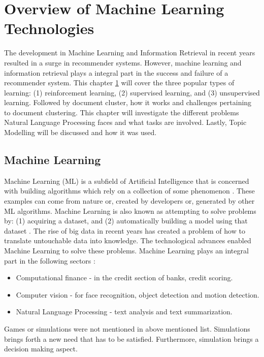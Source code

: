 \chapter{Overview of Machine Learning Technologies}
\label{chap: Chapter 3}
The development in Machine Learning and Information Retrieval in recent years resulted in a surge in recommender systems. However, machine learning and information retrieval plays a integral part in the success and failure of a recommender system. This chapter \ref{chap: Chapter 3} will cover the three popular types of learning: (1) reinforcement learning, (2) supervised learning, and (3) unsupervised learning. Followed by document cluster, how it works and challenges pertaining to document clustering. This chapter will investigate the different problems Natural Language Processing faces and what tasks are involved. Lastly, Topic Modelling will be discussed and how it was used.

\section{Machine Learning} \label{ssec:MLoverview}
Machine Learning (ML) is a subfield of Artificial Intelligence that is concerned with building algorithms which rely on a collection of some phenomenon \cite{Andriybook2019}. These examples can come from nature or, created by developers or, generated by other ML algorithms. Machine Learning is also known as attempting to solve problems by: (1) acquiring a dataset, and (2) automatically building a model using that dataset \cite{sebastiani2002machine}.
The rise of big data in recent years has created a problem of how to translate untouchable data into knowledge. The technological advances enabled Machine Learning to solve these problems. Machine Learning plays an integral part in the following sectors \cite{alpaydin2009introduction}:
\begin{itemize}
  \item Computational finance - in the credit section of banks, credit scoring.
  \item Computer vision - for face recognition, object detection and motion detection.
  \item Natural Language Processing - text analysis and text summarization.
\end{itemize}

Games or simulations were not mentioned in above mentioned list. Simulations brings forth a new need that has to be satisfied. Furthermore, simulation brings a decision making aspect.

